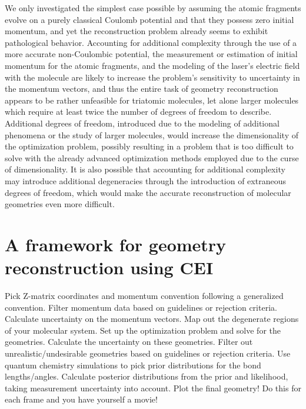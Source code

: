 We only investigated the simplest case possible by assuming the atomic fragments evolve on a purely classical Coulomb potential and that they possess zero initial momentum, and yet the reconstruction problem already seems to exhibit pathological behavior. Accounting for additional complexity through the use of a more accurate non-Coulombic potential, the measurement or estimation of initial momentum for the atomic fragments, and the modeling of the laser's electric field with the molecule are likely to increase the problem's sensitivity to uncertainty in the momentum vectors, and thus the entire task of geometry reconstruction appears to be rather unfeasible for triatomic molecules, let alone larger molecules which require at least twice the number of degrees of freedom to describe. Additional degrees of freedom, introduced due to the modeling of additional phenomena or the study of larger molecules, would increase the dimensionality of the optimization problem, possibly resulting in a problem that is too difficult to solve with the already advanced optimization methods employed due to the curse of dimensionality. It is also possible that accounting for additional complexity may introduce additional degeneracies through the introduction of extraneous degrees of freedom, which would make the accurate reconstruction of molecular geometries even more difficult.

\section{A framework for geometry reconstruction using CEI}
Pick Z-matrix coordinates and momentum convention following a generalized convention.
Filter momentum data based on guidelines or rejection criteria.
Calculate uncertainty on the momentum vectors.
Map out the degenerate regions of your molecular system.
Set up the optimization problem and solve for the geometries.
Calculate the uncertainty on these geometries.
Filter out unrealistic/undesirable geometries based on guidelines or rejection criteria.
Use quantum chemistry simulations to pick prior distributions for the bond lengths/angles.
Calculate posterior distributions from the prior and likelihood, taking measurement uncertainty into account.
Plot the final geometry! Do this for each frame and you have yourself a movie!


